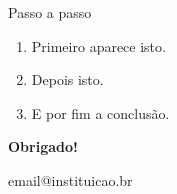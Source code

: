 \documentclass[aspectratio=169,11pt]{beamer}
\begin{document}
\begin{frame}{Passo a passo}
  \begin{enumerate}
    \item<1-> Primeiro aparece isto.
    \item<2-> Depois isto.
    \item<3-> \alert{E por fim a conclusão.}
  \end{enumerate}
\end{frame}

\begin{frame}[plain]
  \centering\vfill
  {\Huge\bfseries Obrigado!}\par\vspace{0.5cm}
  {\color{tocaGrey}email@instituicao.br}
  \vfill
\end{frame}
\end{document}
